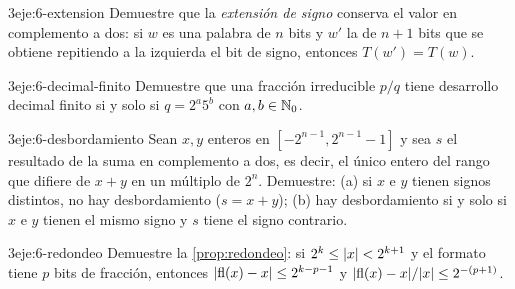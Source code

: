 \begin{ejercicio}{3}{eje:6-extension}
Demuestre que la \emph{extensión de signo} conserva el valor en complemento a dos: si $w$ es una palabra de $n$ bits y $w'$ la de $n+1$ bits que se obtiene repitiendo a la izquierda el bit de signo, entonces $T(w')=T(w)$.
\end{ejercicio}

\begin{ejercicio}{3}{eje:6-decimal-finito}
Demuestre que una fracción irreducible $p/q$ tiene desarrollo decimal finito si y solo si $q=2^a5^b$ con $a,b\in\mathbb{N}_0$.
\end{ejercicio}

\begin{ejercicio}{3}{eje:6-desbordamiento}
Sean $x,y$ enteros en $[-2^{n-1},2^{n-1}-1]$ y sea $s$ el resultado de la suma en complemento a dos, es decir, el único entero del rango que difiere de $x+y$ en un múltiplo de $2^n$. Demuestre: (a) si $x$ e $y$ tienen signos distintos, no hay desbordamiento ($s=x+y$); (b) hay desbordamiento si y solo si $x$ e $y$ tienen el mismo signo y $s$ tiene el signo contrario.
\end{ejercicio}

\begin{ejercicio}{3}{eje:6-redondeo}
Demuestre la \cref{prop:redondeo}: si $2^k\le\lvert x\rvert<2^{k+1}$ y el formato tiene $p$ bits de fracción, entonces $\lvert\operatorname{fl}(x)-x\rvert\le2^{k-p-1}$ y $\lvert\operatorname{fl}(x)-x\rvert/\lvert x\rvert\le2^{-(p+1)}$.
\end{ejercicio}
